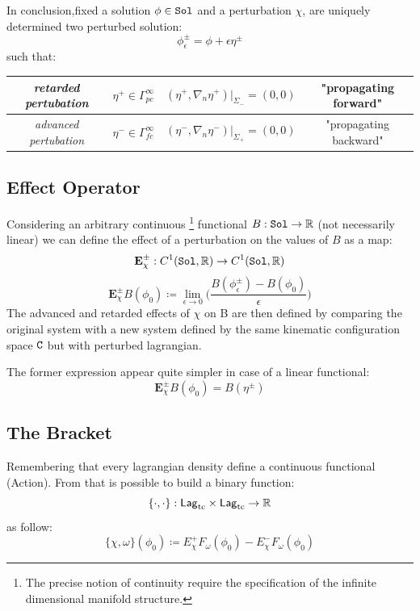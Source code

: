 \documentclass[Main]{subfiles}
\begin{document}
		In conclusion,fixed a solution $\phi\in \mathtt{Sol}$ and a perturbation $\chi$, are uniquely determined two perturbed solution:
   		\begin{equation}\label{PerturbedSolution}
   			\phi^\pm_\epsilon = \phi + \epsilon \eta^\pm
   		\end{equation}
   		such that:
   		
   		\begin{tabular}{|c|c|c|c|}
   		\hline
  	 		\emph{retarded pertubation} & $\eta^+ \in \Gamma^\infty_{pc}$ & $(\eta^+, \nabla_n \eta^+ ) \big \vert_{\Sigma_{-}} = (0,0)$ & "propagating forward" \\
  	 		\hline
   			\emph{advanced pertubation} &$\eta^- \in \Gamma^\infty_{fc}$ & $(\eta^-, \nabla_n \eta^- ) \big \vert_{\Sigma_{+}} = (0,0)$ & "propagating backward" \\
   			\hline
   		\end{tabular}

		
   		
		\subsection{Effect Operator}
		Considering an arbitrary continuous \danger\footnote{The precise notion of continuity require the specification of the infinite dimensional manifold structure.} functional $B: \mathtt{Sol} \rightarrow \mathbb{R}$ (not necessarily linear) we can define the effect of a perturbation on the values of $B$\cite[pag. 5]{Marolf1993} as a map:
		\begin{displaymath}
			\mathbf{E}^\pm_\chi : C^1(\mathtt{Sol},\mathbb{R}) \rightarrow C^1(\mathtt{Sol},\mathbb{R})
		\end{displaymath}
		\begin{displaymath}
		\mathbf{E}_\chi^\pm B ( \phi_0) 
		\coloneqq \lim_{\epsilon \rightarrow 0}
		 \biggr( \frac{B(\phi_\epsilon^\pm) - B (\phi_0)}{\epsilon} \biggr)
		\end{displaymath}
		The advanced and retarded effects of $\chi$ on B are then defined by comparing the original system with a new system defined by the same kinematic configuration space $\mathtt{C}$ but with perturbed lagrangian.
		
		The former expression appear quite simpler in case of a linear functional:
			\begin{equation}
				\mathbf{E}_\chi^\pm B ( \phi_0) =  B(\eta^\pm)
			\end{equation}
		
		\subsection{The Bracket}
		Remembering that every lagrangian density define a continuous functional (Action).
		From that is possible to build a binary function:
		\begin{displaymath}
			\{\cdot,\cdot\}:\mathsf{Lag}_{\textrm{tc}} \times \mathsf{Lag}_{\textrm{tc}} \rightarrow \mathbb{R} 	
		\end{displaymath}
		as follow:
		\begin{equation}\label{AbstractPeierlsBracket}
				\{\chi, \omega \}(\phi_0) \coloneqq E_\chi^+ F_\omega (\phi_0) - E_\chi^- F_\omega(\phi_0)
		\end{equation}
\end{document}
